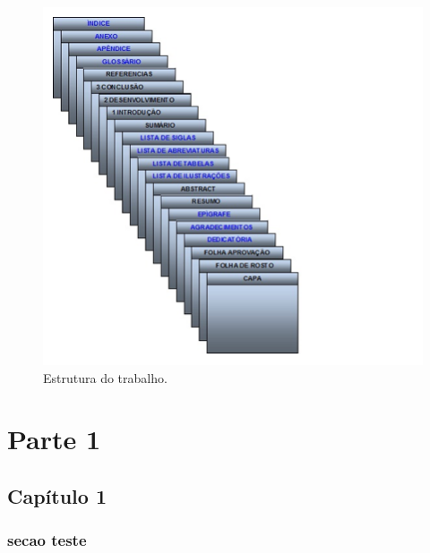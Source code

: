 \documentclass[
	12pt,				%
	openright,			%
	twoside,			%
	a4paper,			%
	chapter=TITLE,		%
	sumario=abnt-6027-2012,
	english,			%
	brazil				%
	]{UFVJM-abntex2}
\begin{document}
\begin{figure}[htb!]
	\centering
	\caption{Estrutura do trabalho.}
	\label{fig:fig1}
	\includegraphics[scale=.95]{img_trab/fig1}
\end{figure}


%




\part{Parte 1}

\chapter{Capítulo 1}

\section{secao teste}
\end{document}
